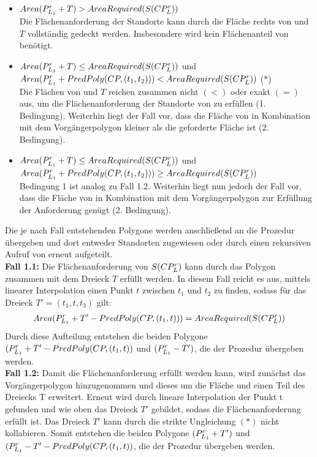 \documentclass[ngerman]{seminarbeitrag}
\begin{document}
\begin{itemize}
\item $Area(P_{L_{1}}^{r} + T) > AreaRequired(S(CP_{L}^{r}))$ \\
Die Flächenanforderung der Standorte kann durch die Fläche rechts von \leins und $T$ vollständig gedeckt werden. Insbesondere wird kein Flächenanteil von benötigt. 
\item $Area(P_{L_{1}}^{r} +T) \le AreaRequired(S(CP_{L}^{r}))$ und \\ $Area(P_{L_{1}}^{r}+PredPoly(CP,(t_{1},t_{2})))<AreaRequired(S(CP_{L}^{r}))$ \hfill ($\ast$) \\
Die Flächen von \prleins und $T$ reichen zusammen nicht $(<)$ oder exakt $(=)$ aus, um die Flächenanforderung der Standorte von \cprl zu erfüllen (1. Bedingung). Weiterhin liegt der Fall vor, dass die Fläche von \prleins in Kombination mit dem Vorgängerpolygon \linebreak {} kleiner als die geforderte Fläche ist (2. Bedingung).
\item $Area(P_{L_{1}}^{r} +T) \le AreaRequired(S(CP_{L}^{r}))$ und \\ $Area(P_{L_{1}}^{r}+PredPoly(CP,(t_{1},t_{2})))\ge AreaRequired(S(CP_{L}^{r}))$ \\
Bedingung 1 ist analog zu Fall 1.2. Weiterhin liegt nun jedoch der Fall vor, dass die Fläche von \prleins in Kombination mit dem Vorgängerpolygon zur Erfüllung der Anforderung genügt (2. Bedingung).
\end{itemize}

Die je nach Fall entstehenden Polygone werden anschließend an die Prozedur \daa übergeben und dort entweder Standorten zugewiesen oder durch einen rekursiven Aufruf von \noncon erneut aufgeteilt.\\

\textbf{Fall 1.1:} Die Flächenanforderung von $S(CP_{L}^{r})$ kann durch das Polygon \prleins zusammen mit dem Dreieck $T$ erfüllt werden. In diesem Fall reicht es aus, mittels linearer Interpolation einen Punkt $t$ zwischen $t_{1}$ und $t_{2}$ zu finden, sodass für das Dreieck $T' = (t_{1}, t, t_{3})$ gilt:
\begin{align*}Area(P_{L_{1}}^{r}+T'-PredPoly(CP,(t_{1},t)))=AreaRequired(S(CP_{L}^{r})) \end{align*}
Durch diese Aufteilung entstehen die beiden Polygone $(P_{L_{1}}^{r} + T' - PredPoly(CP,(t_{1},t))$ und \hbox{$(P_{L_{1}}^{r} -T')$}, die der Prozedur \daa übergeben werden.\\

\textbf{Fall 1.2:} Damit die Flächenanforderung erfüllt werden kann, wird zunächst das Vorgängerpolygon hinzugenommen und dieses um die Fläche \prleins und einen Teil des Dreiecks T erweitert. Erneut wird durch lineare Interpolation der Punkt t gefunden und wie oben das Dreieck $T'$ gebildet, sodass die Flächenanforderung erfüllt ist. Das Dreieck $T'$ kann durch die strikte Ungleichung $(\ast)$ nicht kollabieren. Somit entstehen die beiden Polygone $(P_{L_{1}}^{r} + T')$ und $(P_{L_{1}}^{r} - T' - PredPoly(CP,(t_{1},t))$, die der Prozedur \daa übergeben werden.\\
\end{document}
